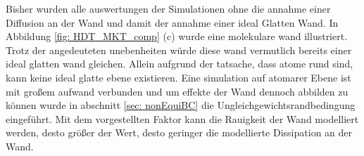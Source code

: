 Bisher wurden alle auswertungen der Simulationen ohne die annahme einer Diffusion an der Wand und damit der annahme einer ideal Glatten Wand. In Abbildung \ref{fig: HDT_MKT_comp} (c) wurde eine molekulare wand illustriert. Trotz der angedeuteten unebenheiten würde diese wand vermutlich bereits einer ideal glatten wand gleichen. Allein aufgrund der tatsache, dass atome rund sind, kann keine ideal glatte ebene existieren. Eine simulation auf atomarer Ebene ist mit großem aufwand verbunden und um effekte der Wand dennoch abbilden zu können wurde in abschnitt \ref{sec: nonEquiBC} die Ungleichgewichtsrandbedingung eingeführt. Mit dem vorgestellten Faktor kann die Rauigkeit der Wand modelliert werden, desto größer der Wert, desto geringer die modellierte Dissipation an der Wand. 

